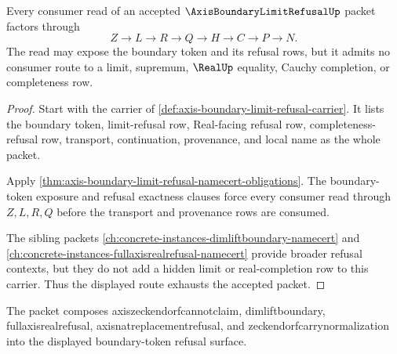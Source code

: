 \begin{theorem}
\label{thm:axis-boundary-limit-refusal-nonescape}
Every consumer read of an accepted $\AxisBoundaryLimitRefusalUp$ packet
factors through
$$
Z \to L \to R \to Q \to H \to C \to P \to N.
$$
The read may expose the boundary token and its refusal rows, but it admits no
consumer route to a limit, supremum, $\RealUp$ equality, Cauchy completion, or
completeness row.
\end{theorem}
\begin{proof}
Start with the carrier of \autoref{def:axis-boundary-limit-refusal-carrier}.
It lists the boundary token, limit-refusal row, Real-facing refusal row,
completeness-refusal row, transport, continuation, provenance, and local name
as the whole packet.

Apply \autoref{thm:axis-boundary-limit-refusal-namecert-obligations}. The
boundary-token exposure and refusal exactness clauses force every consumer
read through $Z,L,R,Q$ before the transport and provenance rows are consumed.

The sibling packets
\autoref{ch:concrete-instances-dimliftboundary-namecert} and
\autoref{ch:concrete-instances-fullaxisrealrefusal-namecert} provide broader
refusal contexts, but they do not add a hidden limit or real-completion row to
this carrier. Thus the displayed route exhausts the accepted packet.
\end{proof}


The packet composes axiszeckendorfcannotclaim, dimliftboundary, fullaxisrealrefusal, axisnatreplacementrefusal, and zeckendorfcarrynormalization into the displayed boundary-token refusal surface.


